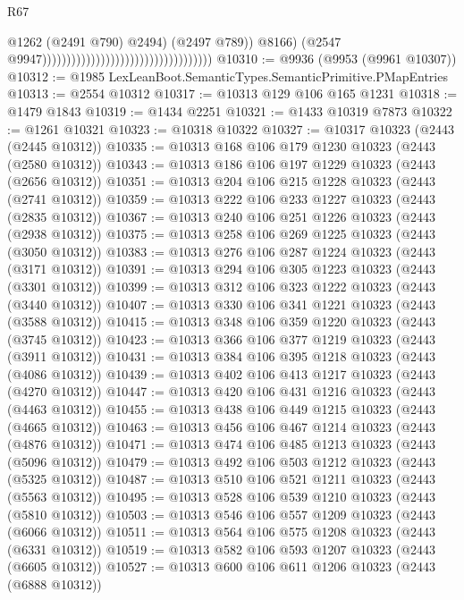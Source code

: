 \begin{lexlean}{R67}
\begin{coremodule}
                                                                              @1262
                                                                              (@2491 @790)
                                                                              @2494)
                                                                            (@2497 @789))
                                                                          @8166)
                                                                        (@2547
                                                                          @9947)))))))))))))))))))))))))))))))))))
@10310 := @9936 (@9953 (@9961 @10307))
@10312 := @1985 LexLeanBoot.SemanticTypes.SemanticPrimitive.PMapEntries
@10313 := @2554 @10312
@10317 := @10313 @129 @106 @165 @1231
@10318 := @1479 @1843
@10319 := @1434 @2251
@10321 := @1433 @10319 @7873
@10322 := @1261 @10321
@10323 := @10318 @10322
@10327 := @10317 @10323 (@2443 (@2445 @10312))
@10335 := @10313 @168 @106 @179 @1230 @10323 (@2443 (@2580 @10312))
@10343 := @10313 @186 @106 @197 @1229 @10323 (@2443 (@2656 @10312))
@10351 := @10313 @204 @106 @215 @1228 @10323 (@2443 (@2741 @10312))
@10359 := @10313 @222 @106 @233 @1227 @10323 (@2443 (@2835 @10312))
@10367 := @10313 @240 @106 @251 @1226 @10323 (@2443 (@2938 @10312))
@10375 := @10313 @258 @106 @269 @1225 @10323 (@2443 (@3050 @10312))
@10383 := @10313 @276 @106 @287 @1224 @10323 (@2443 (@3171 @10312))
@10391 := @10313 @294 @106 @305 @1223 @10323 (@2443 (@3301 @10312))
@10399 := @10313 @312 @106 @323 @1222 @10323 (@2443 (@3440 @10312))
@10407 := @10313 @330 @106 @341 @1221 @10323 (@2443 (@3588 @10312))
@10415 := @10313 @348 @106 @359 @1220 @10323 (@2443 (@3745 @10312))
@10423 := @10313 @366 @106 @377 @1219 @10323 (@2443 (@3911 @10312))
@10431 := @10313 @384 @106 @395 @1218 @10323 (@2443 (@4086 @10312))
@10439 := @10313 @402 @106 @413 @1217 @10323 (@2443 (@4270 @10312))
@10447 := @10313 @420 @106 @431 @1216 @10323 (@2443 (@4463 @10312))
@10455 := @10313 @438 @106 @449 @1215 @10323 (@2443 (@4665 @10312))
@10463 := @10313 @456 @106 @467 @1214 @10323 (@2443 (@4876 @10312))
@10471 := @10313 @474 @106 @485 @1213 @10323 (@2443 (@5096 @10312))
@10479 := @10313 @492 @106 @503 @1212 @10323 (@2443 (@5325 @10312))
@10487 := @10313 @510 @106 @521 @1211 @10323 (@2443 (@5563 @10312))
@10495 := @10313 @528 @106 @539 @1210 @10323 (@2443 (@5810 @10312))
@10503 := @10313 @546 @106 @557 @1209 @10323 (@2443 (@6066 @10312))
@10511 := @10313 @564 @106 @575 @1208 @10323 (@2443 (@6331 @10312))
@10519 := @10313 @582 @106 @593 @1207 @10323 (@2443 (@6605 @10312))
@10527 := @10313 @600 @106 @611 @1206 @10323 (@2443 (@6888 @10312))

\end{coremodule}
\end{lexlean}

